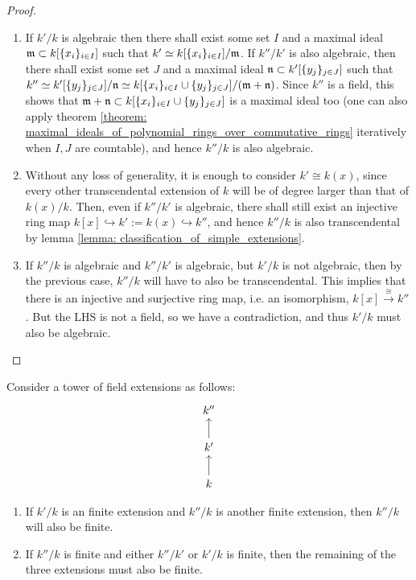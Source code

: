             \begin{proof}
                \begin{enumerate}
                    \item If $k'/k$ is algebraic then there shall exist some set $I$ and a maximal ideal $\mathfrak{m} \subset k[\{x_i\}_{i \in I}]$ such that $k' \simeq k[\{x_i\}_{i \in I}]/\mathfrak{m}$. If $k''/k'$ is also algebraic, then there shall exist some set $J$ and a maximal ideal $\mathfrak{n} \subset k'[\{y_j\}_{j \in J}]$ such that $k'' \simeq k'[\{y_j\}_{j \in J}]/\mathfrak{n} \simeq k[\{x_i\}_{i \in I} \cup \{y_j\}_{j \in J}]/(\mathfrak{m} + \mathfrak{n})$. Since $k''$ is a field, this shows that $\mathfrak{m} + \mathfrak{n} \subset k[\{x_i\}_{i \in I} \cup \{y_j\}_{j \in J}]$ is a maximal ideal too (one can also apply theorem \ref{theorem: maximal_ideals_of_polynomial_rings_over_commutative_rings} iteratively when $I, J$ are countable), and hence $k''/k$ is also algebraic. 
                    \item Without any loss of generality, it is enough to consider $k' \cong k(x)$, since every other transcendental extension of $k$ will be of degree larger than that of $k(x)/k$. Then, even if $k''/k'$ is algebraic, there shall still exist an injective ring map $k[x] \hookrightarrow k' := k(x) \hookrightarrow k''$, and hence $k''/k$ is also transcendental by lemma \ref{lemma: classification_of_simple_extensions}. 
                    \item If $k''/k$ is algebraic and $k''/k'$ is algebraic, but $k'/k$ is not algebraic, then by the previous case, $k''/k$ will have to also be transcendental. This implies that there is an injective and surjective ring map, i.e. an isomorphism, $k[x] \xrightarrow[]{\cong} k''$. But the LHS is not a field, so we have a contradiction, and thus $k'/k$ must also be algebraic. 
                \end{enumerate}
            \end{proof}
        \begin{remark} \label{remark: towers_of_finite_extensions}
            Consider a tower of field extensions as follows:
                $$
                    \begin{tikzcd}
                        {k''} \\
                        {k'} \\
                        k
                        \arrow[from=2-1, to=1-1]
                        \arrow[from=3-1, to=2-1]
                    \end{tikzcd}
                $$
            \begin{enumerate}
                \item If $k'/k$ is an finite extension and $k''/k$ is another finite extension, then $k''/k$ will also be finite.
                \item If $k''/k$ is finite and either $k''/k'$ or $k'/k$ is finite, then the remaining of the three extensions must also be finite.
            \end{enumerate}
        \end{remark}
        
